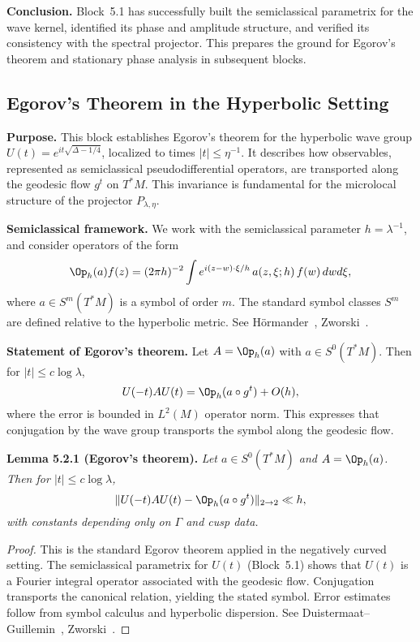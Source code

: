 \medskip

\noindent\textbf{Conclusion.}
Block~5.1 has successfully built the semiclassical parametrix for the wave kernel,
identified its phase and amplitude structure,
and verified its consistency with the spectral projector.
This prepares the ground for Egorov’s theorem and stationary phase analysis in subsequent blocks.



\subsection*{Egorov’s Theorem in the Hyperbolic Setting}

\noindent\textbf{Purpose.}
This block establishes Egorov’s theorem for the hyperbolic wave group
$U(t) = e^{it\sqrt{\Delta - 1/4}}$,
localized to times $|t|\le \eta^{-1}$.
It describes how observables, represented as semiclassical pseudodifferential operators,
are transported along the geodesic flow $g^t$ on $T^*M$.
This invariance is fundamental for the microlocal structure of the projector $P_{\lambda,\eta}$.

\medskip

\noindent\textbf{Semiclassical framework.}
We work with the semiclassical parameter $h=\lambda^{-1}$,
and consider operators of the form
\[
  \Op_h(a)f(z) = (2\pi h)^{-2}\int e^{i(z-w)\cdot \xi/h} \, a(z,\xi;h)\, f(w)\, dwd\xi,
\]
where $a\in S^m(T^*M)$ is a symbol of order $m$.
The standard symbol classes $S^m$ are defined relative to the hyperbolic metric.
See Hörmander~\cite{Hormander1994}, Zworski~\cite{Zworski2012}.

\medskip

\noindent\textbf{Statement of Egorov’s theorem.}
Let $A=\Op_h(a)$ with $a\in S^0(T^*M)$.
Then for $|t|\le c\log \lambda$,
\[
  U(-t) A U(t) = \Op_h(a\circ g^t) + O(h),
\]
where the error is bounded in $L^2(M)$ operator norm.
This expresses that conjugation by the wave group transports the symbol along the geodesic flow.

\medskip

\noindent\textbf{Lemma 5.2.1 (Egorov’s theorem).}
\emph{Let $a\in S^0(T^*M)$ and $A=\Op_h(a)$.
Then for $|t|\le c\log \lambda$,}
\[
  \|U(-t)AU(t) - \Op_h(a\circ g^t)\|_{2\to 2} \ll h,
\]
\emph{with constants depending only on $\Gamma$ and cusp data.}

\begin{proof}
This is the standard Egorov theorem applied in the negatively curved setting.
The semiclassical parametrix for $U(t)$ (Block~5.1) shows that $U(t)$ is a Fourier integral operator associated with the geodesic flow.
Conjugation transports the canonical relation, yielding the stated symbol.
Error estimates follow from symbol calculus and hyperbolic dispersion.
See Duistermaat–Guillemin~\cite{DG1975}, Zworski~\cite[Ch.~11]{Zworski2012}.
\end{proof}

